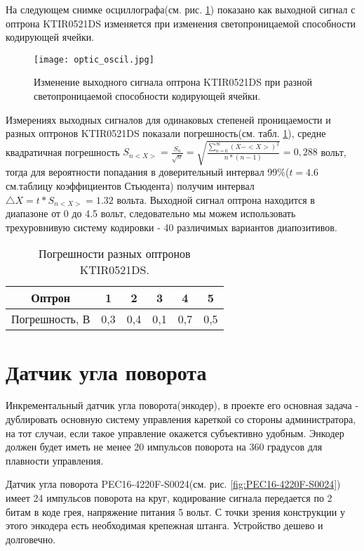 На следующем снимке осциллографа(см. рис. \ref{fig:optic_oscil}) показано как выходной сигнал с оптрона KTIR0521DS изменяется при изменения светопроницаемой способности кодирующей ячейки.

\begin{figure}[h]
	\centering
     \texttt{[image: optic\_oscil.jpg]}
	\caption
	{
	Изменение выходного сигнала оптрона KTIR0521DS при разной светопроницаемой способности кодирующей ячейки.
	}
	\label{fig:optic_oscil}
\end{figure}

Измерениях выходных сигналов для одинаковых степеней проницаемости и разных оптронов KTIR0521DS показали погрешность(см. табл. \ref{tab:optical_error}), средне квадратичная погрешность $ S_{n<X>}=\frac{S_{n}}{\sqrt{n}}=\sqrt{\frac{\sum_{n=0}^\infty(X-<X>)^{2}}{n*(n-1)}}= 0,288$ вольт, тогда для вероятности попадания в доверительный интервал 99\%($t=4.6$ см.таблицу коэффициентов Стьюдента) получим интервал  $ \triangle X = t*S_{n<X>}=1.32$ вольта. Выходной сигнал оптрона находится в диапазоне от 0 до 4.5 вольт, следовательно мы можем использовать трехуровнивую систему кодировки - 40 различимых вариантов диапозитивов.
\begin{table}
	\centering
\begin{tabular}{|c|c|c|c|c|c|}
\hline 
Оптрон & 1 & 2 & 3 & 4 & 5 \\ 
\hline 
Погрешность, В & 0,3 & 0,4 & 0,1 & 0,7 & 0,5 \\ 
\hline 
\end{tabular} 
	\caption{Погрешности разных оптронов KTIR0521DS.}
	\label{tab:optical_error}
\end{table}

\section{Датчик угла поворота}
%
Инкрементальный датчик угла поворота(энкодер), в проекте его основная задача - дублировать основную систему управления кареткой со стороны администратора, на тот случаи, если такое управление окажется субъективно удобным. Энкодер должен будет иметь не менее 20 импульсов поворота на 360 градусов для плавности управления.

Датчик угла поворота PEC16-4220F-S0024(см. рис. \ref{fig:PEC16-4220F-S0024}) имеет 24 импульсов поворота на круг, кодирование сигнала передается по 2 битам в коде грея, напряжение питания 5 вольт. С точки зрения конструкции у этого энкодера есть необходимая крепежная штанга. Устройство дешево и долговечно.

